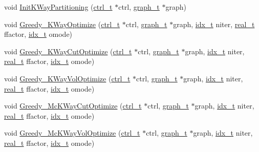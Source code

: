\begin{DoxyCompactItemize}
\item 
void \hyperlink{a00945_a870e37cc14eb1033c62d83d3a7c33a91}{Init\+K\+Way\+Partitioning} (\hyperlink{a00742}{ctrl\+\_\+t} $\ast$ctrl, \hyperlink{a00734}{graph\+\_\+t} $\ast$graph)
\item 
void \hyperlink{a00945_a063b67f1b75662342f8db5aefba11cc5}{Greedy\+\_\+\+K\+Way\+Optimize} (\hyperlink{a00742}{ctrl\+\_\+t} $\ast$ctrl, \hyperlink{a00734}{graph\+\_\+t} $\ast$graph, \hyperlink{a00876_aaa5262be3e700770163401acb0150f52}{idx\+\_\+t} niter, \hyperlink{a00876_a1924a4f6907cc3833213aba1f07fcbe9}{real\+\_\+t} ffactor, \hyperlink{a00876_aaa5262be3e700770163401acb0150f52}{idx\+\_\+t} omode)
\item 
void \hyperlink{a00945_aaa70dea85e3a1149132362c93099d543}{Greedy\+\_\+\+K\+Way\+Cut\+Optimize} (\hyperlink{a00742}{ctrl\+\_\+t} $\ast$ctrl, \hyperlink{a00734}{graph\+\_\+t} $\ast$graph, \hyperlink{a00876_aaa5262be3e700770163401acb0150f52}{idx\+\_\+t} niter, \hyperlink{a00876_a1924a4f6907cc3833213aba1f07fcbe9}{real\+\_\+t} ffactor, \hyperlink{a00876_aaa5262be3e700770163401acb0150f52}{idx\+\_\+t} omode)
\item 
void \hyperlink{a00945_af249da13cad4e148e2a6efcacad5d5da}{Greedy\+\_\+\+K\+Way\+Vol\+Optimize} (\hyperlink{a00742}{ctrl\+\_\+t} $\ast$ctrl, \hyperlink{a00734}{graph\+\_\+t} $\ast$graph, \hyperlink{a00876_aaa5262be3e700770163401acb0150f52}{idx\+\_\+t} niter, \hyperlink{a00876_a1924a4f6907cc3833213aba1f07fcbe9}{real\+\_\+t} ffactor, \hyperlink{a00876_aaa5262be3e700770163401acb0150f52}{idx\+\_\+t} omode)
\item 
void \hyperlink{a00945_a68223b074be60fa4ac030e3c52071410}{Greedy\+\_\+\+Mc\+K\+Way\+Cut\+Optimize} (\hyperlink{a00742}{ctrl\+\_\+t} $\ast$ctrl, \hyperlink{a00734}{graph\+\_\+t} $\ast$graph, \hyperlink{a00876_aaa5262be3e700770163401acb0150f52}{idx\+\_\+t} niter, \hyperlink{a00876_a1924a4f6907cc3833213aba1f07fcbe9}{real\+\_\+t} ffactor, \hyperlink{a00876_aaa5262be3e700770163401acb0150f52}{idx\+\_\+t} omode)
\item 
void \hyperlink{a00945_a4177983ff9528ecb665a71f0ab1785e9}{Greedy\+\_\+\+Mc\+K\+Way\+Vol\+Optimize} (\hyperlink{a00742}{ctrl\+\_\+t} $\ast$ctrl, \hyperlink{a00734}{graph\+\_\+t} $\ast$graph, \hyperlink{a00876_aaa5262be3e700770163401acb0150f52}{idx\+\_\+t} niter, \hyperlink{a00876_a1924a4f6907cc3833213aba1f07fcbe9}{real\+\_\+t} ffactor, \hyperlink{a00876_aaa5262be3e700770163401acb0150f52}{idx\+\_\+t} omode)
\item 

\end{DoxyCompactItemize}
